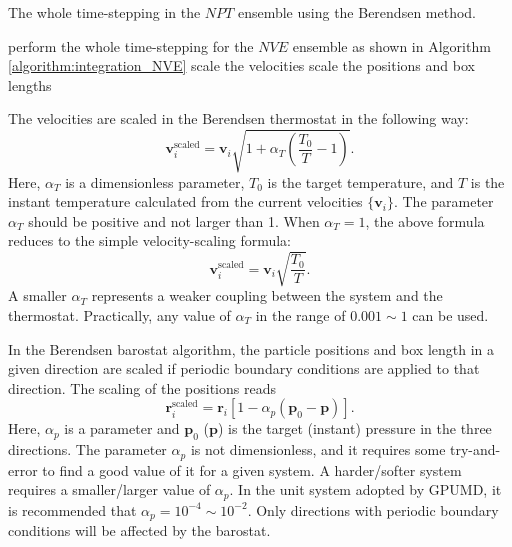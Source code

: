 \documentclass[12pt,a4paper]{report}
\newcommand{\vect}[1]{\boldsymbol{#1}}
\begin{document}
\begin{algorithm}[htb]
\caption{The whole time-stepping in the $NPT$ ensemble using the Berendsen method. }
\label{algorithm:Berendsen-NPT}
\begin{algorithmic}[1]
\State perform the whole time-stepping for the $NVE$ ensemble as shown in Algorithm \ref{algorithm:integration_NVE}
\State scale the velocities
\State scale the positions and box lengths
\end{algorithmic}
\end{algorithm}



The velocities are scaled in the Berendsen thermostat in the following way:
\begin{equation}
\vect{v}_i^{\text{scaled}}
= \vect{v}_i
\sqrt{1 + \alpha_T \left(\frac{T_0}{T} - 1\right)}.
\end{equation}
Here, $\alpha_T$ is a dimensionless parameter, $T_0$ is the target temperature, and $T$ is the instant temperature calculated from the current velocities $\{ \vect{v}_i \}$. The parameter $\alpha_T$ should be positive and not larger than 1. When $\alpha_T=1$, the above formula reduces to the simple velocity-scaling formula:
\begin{equation}
\vect{v}_i^{\text{scaled}}
= \vect{v}_i \sqrt{\frac{T_0}{T}}.
\end{equation}
A smaller $\alpha_T$ represents a weaker coupling between the system and the thermostat. Practically, any value of $\alpha_T$ in the range of $0.001 \sim 1$ can be used.



In the Berendsen barostat algorithm, the particle positions and box length in a given direction are scaled if periodic boundary conditions are applied to that direction. The scaling of the positions reads
\begin{equation}
\vect{r}_i^{\text{scaled}}
= \vect{r}_i \left[ 1-\alpha_p (\vect{p}_0 - \vect{p}) \right].
\end{equation}
Here, $\alpha_p$ is a parameter and $\vect{p}_0$ ($\vect{p}$) is the target (instant) pressure in the three directions. The parameter $\alpha_p$ is not dimensionless, and it requires some try-and-error to find a good value of it for a given system. A harder/softer system requires a smaller/larger value of $\alpha_p$. In the unit system adopted by GPUMD, it is recommended that $\alpha_p = 10^{-4} \sim 10^{-2}$.
Only directions with periodic boundary conditions will be affected by the barostat.
\end{document}
